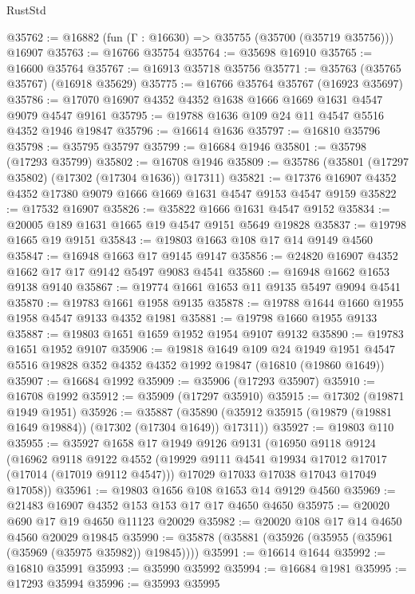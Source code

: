 \begin{lexlean}{RustStd}
\begin{coremodule}
{\begin{coremodule}
{{{{{{{{{{{{{{{{{{{{{{{{{{{{{{{{{{{{{{{{{{{{{{{{{{{{{{{@35762 := @16882 (fun (Γ : @16630) => @35755 (@35700 (@35719 @35756))) @16907
@35763 := @16766 @35754
@35764 := @35698 @16910
@35765 := @16600 @35764
@35767 := @16913 @35718 @35756
@35771 := @35763 (@35765 @35767) (@16918 @35629)
@35775 := @16766 @35764 @35767 (@16923 @35697)
@35786 := @17070 @16907 @4352 @4352 @1638 @1666 @1669 @1631 @4547 @9079 @4547 @9161
@35795 := @19788 @1636 @109 @24 @11 @4547 @5516 @4352 @1946 @19847
@35796 := @16614 @1636
@35797 := @16810 @35796
@35798 := @35795 @35797
@35799 := @16684 @1946
@35801 := @35798 (@17293 @35799)
@35802 := @16708 @1946
@35809 := @35786 (@35801 (@17297 @35802) (@17302 (@17304 @1636)) @17311)
@35821 := @17376 @16907 @4352 @4352 @17380 @9079 @1666 @1669 @1631 @4547 @9153 @4547 @9159
@35822 := @17532 @16907
@35826 := @35822 @1666 @1631 @4547 @9152
@35834 := @20005 @189 @1631 @1665 @19 @4547 @9151 @5649 @19828
@35837 := @19798 @1665 @19 @9151
@35843 := @19803 @1663 @108 @17 @14 @9149 @4560
@35847 := @16948 @1663 @17 @9145 @9147
@35856 := @24820 @16907 @4352 @1662 @17 @17 @9142 @5497 @9083 @4541
@35860 := @16948 @1662 @1653 @9138 @9140
@35867 := @19774 @1661 @1653 @11 @9135 @5497 @9094 @4541
@35870 := @19783 @1661 @1958 @9135
@35878 := @19788 @1644 @1660 @1955 @1958 @4547 @9133 @4352 @1981
@35881 := @19798 @1660 @1955 @9133
@35887 := @19803 @1651 @1659 @1952 @1954 @9107 @9132
@35890 := @19783 @1651 @1952 @9107
@35906 := @19818
    @1649
    @109
    @24
    @1949
    @1951
    @4547
    @5516
    @19828
    @352
    @4352
    @4352
    @1992
    @19847
    (@16810 (@19860 @1649))
@35907 := @16684 @1992
@35909 := @35906 (@17293 @35907)
@35910 := @16708 @1992
@35912 := @35909 (@17297 @35910)
@35915 := @17302 (@19871 @1949 @1951)
@35926 := @35887
    (@35890 (@35912 @35915 (@19879 (@19881 @1649 @19884)) (@17302 (@17304 @1649)) @17311))
@35927 := @19803 @110
@35955 := @35927
    @1658
    @17
    @1949
    @9126
    @9131
    (@16950
      @9118
      @9124
      (@16962
        @9118
        @9122
        @4552
        (@19929 @9111 @4541 @19934 @17012 @17017 (@17014 (@17019 @9112 @4547)))
        @17029
        @17033
        @17038
        @17043
        @17049
        @17058))
@35961 := @19803 @1656 @108 @1653 @14 @9129 @4560
@35969 := @21483 @16907 @4352 @153 @153 @17 @17 @4650 @4650
@35975 := @20020 @690 @17 @19 @4650 @11123 @20029
@35982 := @20020 @108 @17 @14 @4650 @4560 @20029 @19845
@35990 := @35878 (@35881 (@35926 (@35955 (@35961 (@35969 (@35975 @35982)) @19845))))
@35991 := @16614 @1644
@35992 := @16810 @35991
@35993 := @35990 @35992
@35994 := @16684 @1981
@35995 := @17293 @35994
@35996 := @35993 @35995
}}}}}}}}}}}}}}}}}}}}}}}}}}}}}}}}}}}}}}}}}}}}}}}}}}}}}}}
\end{coremodule}}
\end{coremodule}
\end{lexlean}
